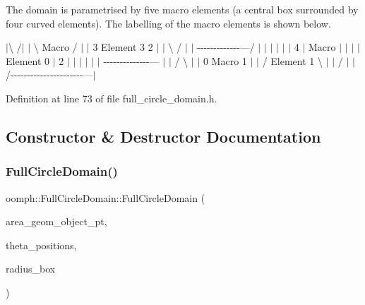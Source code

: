 The domain is parametrised by five macro elements (a central box surrounded by four curved elements). The labelling of the macro elements is shown below. 

 $\vert$\textbackslash{} /$\vert$ $\vert$ \textbackslash{} Macro / $\vert$ $\vert$ 3 Element 3 2 $\vert$ $\vert$ \textbackslash{} / $\vert$ $\vert$ -\/-\/-\/-\/-\/-\/-\/-\/-\/-\/-\/-\/-\/---/ $\vert$ $\vert$ $\vert$ $\vert$ $\vert$ $\vert$ 4 $\vert$ Macro $\vert$ $\vert$ $\vert$ $\vert$ Element 0 $\vert$ 2 $\vert$ $\vert$ $\vert$ $\vert$ $\vert$ $\vert$ -\/-\/-\/-\/-\/-\/-\/-\/-\/-\/-\/-\/-\/-\/--- $\vert$ $\vert$ / \textbackslash{} $\vert$ $\vert$ 0 Macro 1 $\vert$ $\vert$ / Element 1 \textbackslash{} $\vert$ $\vert$ / $|$ $\vert$/-\/-\/-\/-\/-\/-\/-\/-\/-\/-\/-\/-\/-\/-\/-\/-\/-\/-\/-\/-\/-\/-\/---$\vert$ 

Definition at line 73 of file full\+\_\+circle\+\_\+domain.\+h.



\subsection{Constructor \& Destructor Documentation}
\mbox{\label{classoomph_1_1FullCircleDomain_a35697cff7683dde517a2b8cf912a6aac}} 
\subsubsection{\texorpdfstring{Full\+Circle\+Domain()}{FullCircleDomain()}\hspace{0.1cm}{\footnotesize\ttfamily [1/2]}}
{\footnotesize\ttfamily oomph\+::\+Full\+Circle\+Domain\+::\+Full\+Circle\+Domain (\begin{DoxyParamCaption}\item[{Geom\+Object $\ast$}]{area\+\_\+geom\+\_\+object\+\_\+pt,  }\item[{const Vector$<$ double $>$ \&}]{theta\+\_\+positions,  }\item[{const Vector$<$ double $>$ \&}]{radius\+\_\+box }\end{DoxyParamCaption})\hspace{0.3cm}{\ttfamily [inline]}}




